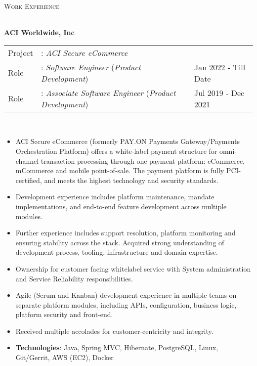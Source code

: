 \documentclass[a4paper]{article}
\newcommand{\lineunder} {
    \vspace*{-8pt} \\
    \hspace*{-18pt} \hrulefill \\
}
\newcommand{\header} [1] {
    {\hspace*{-18pt}\vspace*{6pt} \textsc{#1}}
    \vspace*{-6pt} \lineunder
}
\begin{document}
\header{Work Experience}
\vspace{1mm}

\textbf{ACI Worldwide, Inc} \\
\noindent
\begin{tabularx}{\textwidth}{ l l>{\raggedleft\arraybackslash}X}
  Project & : \textit{ACI Secure eCommerce} & \\
  Role & : \textit{Software Engineer} (\textit{Product Development})  & Jan 2022 - Till Date \\
  Role & : \textit{Associate Software Engineer} (\textit{Product Development})  & Jul 2019 - Dec 2021 \\
\end{tabularx}
\textbf{} \\
\begin{itemize} \itemsep 1pt
  \item ACI Secure eCommerce (formerly PAY.ON Payments Gateway/Payments Orchestration Platform) offers a white-label payment structure for omni-channel transaction processing through one payment platform: eCommerce, mCommerce and mobile point-of-sale. The payment platform is fully PCI-certified, and meets the highest technology and security standards.
  \item Development experience includes platform maintenance, mandate implementations, and end-to-end feature development across multiple modules.
  \item Further experience includes support resolution, platform monitoring and ensuring stability across the stack. Acquired strong understanding of development process, tooling, infrastructure and domain expertise.
  \item Ownership for customer facing whitelabel service with System administration and Service Reliability responsibilities.
  \item Agile (Scrum and Kanban) development experience in multiple teams on separate platform modules, including APIs, configuration, business logic, platform security and front-end.
  \item Received multiple accolades for customer-centricity and integrity.
  \item \textbf{Technologies}: Java, Spring MVC, Hibernate, PostgreSQL, Linux, Git/Gerrit, AWS (EC2), Docker
\end{itemize}

\end{document}
